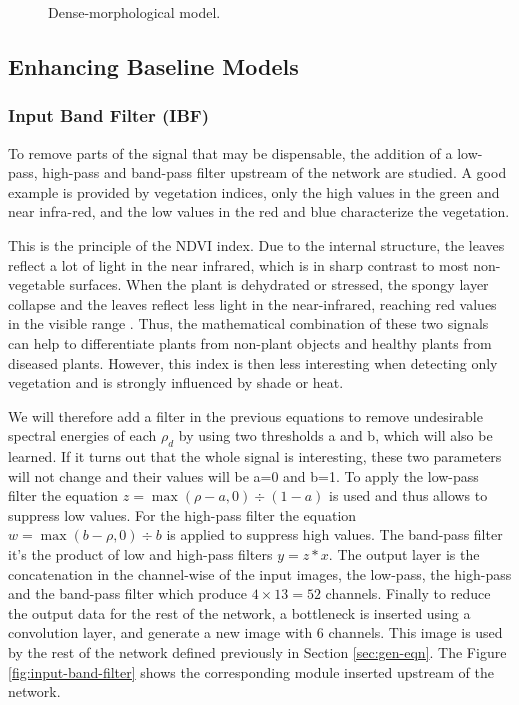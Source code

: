 \documentclass[../thesis.tex]{subfiles}
\begin{document}
	\begin{figure}[H]
		\centering
		
		\caption{ {Dense}-morphological model.}
		\label{fig:dense-morphological}
	\end{figure}
	
	\subsection{Enhancing Baseline Models}
	
	\subsubsection{Input Band Filter (IBF)} To remove parts of the signal that may be dispensable, the addition of a low-pass, high-pass and band-pass filter upstream of the network are studied. A good example is provided by vegetation indices, only the high values in the green and near infra-red, and the low values in the red and blue characterize the vegetation.
	
    \newpage
	This is the principle of the NDVI index. Due to the internal structure, the leaves reflect a lot of light in the near infrared, which is in sharp contrast to most non-vegetable surfaces. When the plant is dehydrated or stressed, the spongy layer collapse and the leaves reflect less light in the near-infrared, reaching red values in the visible range \cite{joshi2020revolution}. Thus, the mathematical combination of these two signals can help to differentiate plants from non-plant objects and healthy plants from diseased plants. However, this index is {then less interesting when detecting only vegetation and is strongly influenced by shade or heat.}
	
	We will therefore add a filter in the previous equations to remove undesirable spectral energies of each $\rho_d$ by using two thresholds a and b, which will also be learned. If it turns out that the whole signal is interesting, these two parameters will not change and their values will be a=0 and b=1. To apply the low-pass filter the equation $z = \max(\rho-a,0) \div (1-a)$ is used and thus allows to suppress low values. For the high-pass filter the equation $w = \max(b-\rho,0) \div b$ is applied to suppress high values. The band-pass filter it's the product of low and high-pass filters $y = z*x$. The output layer is the concatenation in the channel-wise of the input images, the low-pass, the high-pass and the band-pass filter which produce $4  \times 13=52$ channels. Finally to reduce the output data for the rest of the network, a bottleneck is inserted using a convolution layer, and generate a new image with 6 channels. This image is used by the rest of the network defined previously in Section \ref{sec:gen-eqn}. The Figure \ref{fig:input-band-filter} shows the corresponding module inserted upstream of the network.
	
\end{document}
